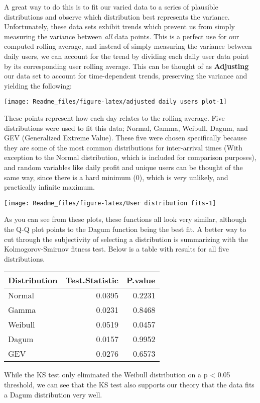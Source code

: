 \documentclass[]{article}
\begin{document}
A great way to do this is to fit our varied data to a series of
plausible distributions and observe which distribution best represents
the variance. Unfortunately, these data sets exhibit trends which
prevent us from simply measuring the variance between \emph{all} data
points. This is a perfect use for our computed rolling average, and
instead of simply measuring the variance between daily users, we can
account for the trend by dividing each daily user data point by its
corresponding user rolling average. This can be thought of as
\textbf{Adjusting} our data set to account for time-dependent trends,
preserving the variance and yielding the following:

\begin{center}\texttt{[image: Readme\_files/figure-latex/adjusted daily users plot-1]} \end{center}

These points represent how each day relates to the rolling average. Five
distributions were used to fit this data; Normal, Gamma, Weibull, Dagum,
and GEV (Generalized Extreme Value). These five were chosen specifically
because they are some of the most common distributions for inter-arrival
times (With exception to the Normal distribution, which is included for
comparison purposes), and random variables like daily profit and unique
users can be thought of the same way, since there is a hard minimum (0),
which is very unlikely, and practically infinite maximum.

\begin{center}\texttt{[image: Readme\_files/figure-latex/User distribution fits-1]} \end{center}

As you can see from these plots, these functions all look very similar,
although the Q-Q plot points to the Dagum function being the best fit. A
better way to cut through the subjectivity of selecting a distribution
is summarizing with the Kolmogorov-Smirnov fitness test. Below is a
table with results for all five distributions.

\begin{longtable}[]{@{}lrr@{}}
\toprule
Distribution & Test.Statistic & P.value\tabularnewline
\midrule
\endhead
Normal & 0.0395 & 0.2231\tabularnewline
Gamma & 0.0231 & 0.8468\tabularnewline
Weibull & 0.0519 & 0.0457\tabularnewline
Dagum & 0.0157 & 0.9952\tabularnewline
GEV & 0.0276 & 0.6573\tabularnewline
\bottomrule
\end{longtable}

While the KS test only eliminated the Weibull distribution on a p
\textless{} 0.05 threshold, we can see that the KS test also supports
our theory that the data fits a Dagum distribution very well.
\end{document}
